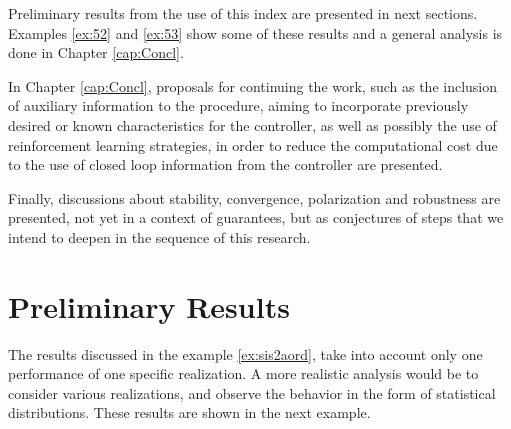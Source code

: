 Preliminary results from the use of this index are presented in next sections. Examples \ref{ex:52} and \ref{ex:53} show some of these results and a general analysis is done in Chapter \ref{cap:Concl}.

In Chapter \ref{cap:Concl}, proposals for continuing the work, such as the inclusion of auxiliary information to the procedure, aiming to incorporate previously desired or known characteristics for the controller, as well as possibly the use of reinforcement learning strategies, in order to reduce the computational cost due to the use of closed loop information from the controller are presented.

Finally, discussions about stability, convergence, polarization and robustness are presented, not yet in a context of guarantees, but as conjectures of steps that we intend to deepen in the sequence of this research.

\section{Preliminary Results}\label{sec:prel_results}



The results discussed in the example \ref{ex:sis2aord}, take into account only one performance of one specific realization. A more realistic analysis would be to consider various realizations, and observe the behavior in the form of statistical distributions. These results are shown in the next example.

